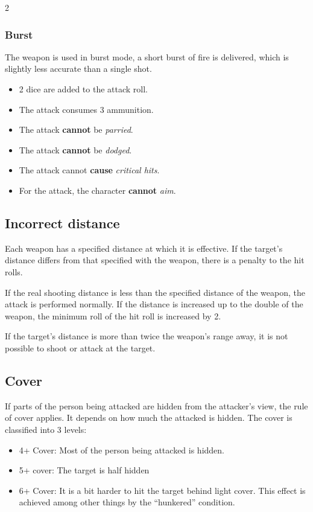 \begin{multicols}{2}
{\subsubsection{Burst}

The weapon is used in burst mode, a short burst of fire is delivered, which is slightly less accurate than a single shot.
\begin{itemize}
    \item 2 dice are added to the attack roll.
    \item The attack consumes 3 ammunition.
    \item The attack \textbf{cannot} be \textit{parried}.
    \item The attack \textbf{cannot} be \textit{dodged}.
    \item The attack cannot \textbf{cause} \textit{critical hits}.
    \item For the attack, the character \textbf{cannot} \textit{aim}.
\end{itemize}
}

\subsection{Incorrect distance}

Each weapon has a specified distance at which it is effective. If the target's distance differs from that specified with the weapon, there is a penalty to the hit rolls.

If the real shooting distance is less than the specified distance of the weapon, the attack is performed normally. If the distance is increased up to the double of the weapon, the minimum roll of the hit roll is increased by 2.

If the target's distance is more than twice the weapon's range away, it is not possible to shoot or attack at the target.

\subsection{Cover}

If parts of the person being attacked are hidden from the attacker's view, the rule of cover applies. It depends on how much the attacked is hidden. The cover is classified into 3 levels:
\begin{itemize}
    \item 4+ Cover: Most of the person being attacked is hidden.
    \item 5+ cover: The target is half hidden
    \item 6+ Cover: It is a bit harder to hit the target behind light cover. This effect is achieved among other things by the ``hunkered'' condition.
\end{itemize}


\end{multicols}

